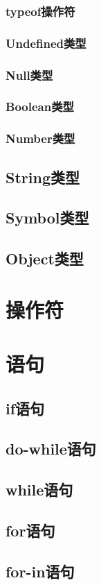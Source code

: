 \subsubsection{typeof操作符}
\subsubsection{Undefined类型}
\subsubsection{Null类型}
\subsubsection{Boolean类型}
\subsubsection{Number类型}
\subsection{String类型}
\subsection{Symbol类型}
\subsection{Object类型}
\section{操作符}
\section{语句}
\subsection{if语句}
\subsection{do-while语句}
\subsection{while语句}
\subsection{for语句}
\subsection{for-in语句}
